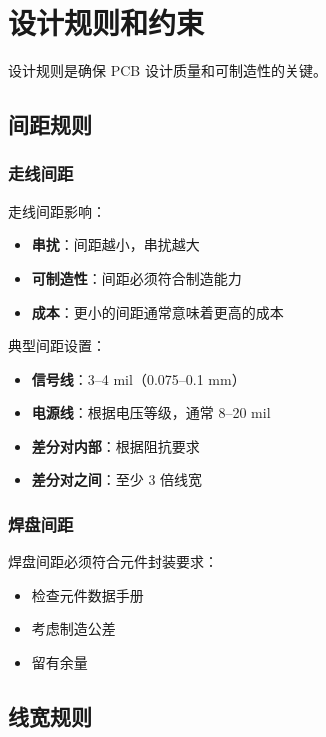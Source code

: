 \section{设计规则和约束}

设计规则是确保 PCB 设计质量和可制造性的关键。

\subsection{间距规则}

\subsubsection{走线间距}

走线间距影响：

\begin{itemize}
  \item \textbf{串扰}：间距越小，串扰越大
  \item \textbf{可制造性}：间距必须符合制造能力
  \item \textbf{成本}：更小的间距通常意味着更高的成本
\end{itemize}

典型间距设置：

\begin{itemize}
  \item \textbf{信号线}：3--4 mil（0.075--0.1 mm）
  \item \textbf{电源线}：根据电压等级，通常 8--20 mil
  \item \textbf{差分对内部}：根据阻抗要求
  \item \textbf{差分对之间}：至少 3 倍线宽
\end{itemize}

\subsubsection{焊盘间距}

焊盘间距必须符合元件封装要求：

\begin{itemize}
  \item 检查元件数据手册
  \item 考虑制造公差
  \item 留有余量
\end{itemize}

\subsection{线宽规则}

